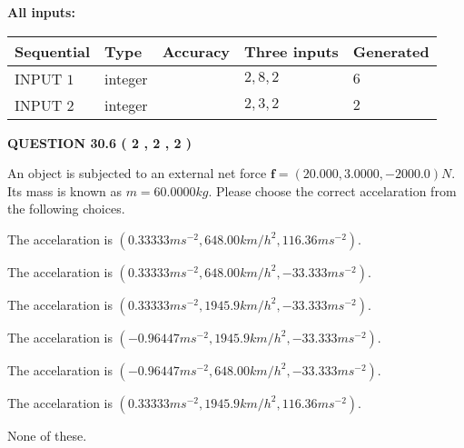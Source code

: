 \documentclass[12pt]{article}
\begin{document}
   
   
   
\noindent\vspace{0.1in}\hspace{-0.08in} {\textbf{\Large{All inputs: }}}
   
   
  
  
\noindent\begin{tabular}{|l|l|l|l|l|}
\hline
 Sequential & Type & Accuracy & Three inputs & Generated \\ 
\hline
 
 
  INPUT $            1 $ & integer &  & $
 2
 , 
 8
 , 
 2
 $ & $ 6 $ 
 \\  \hline  
 
 
  INPUT $            2 $ & integer &  & $
 2
 , 
 3
 , 
 2
 $ & $ 2 $ 
 \\  \hline  
 \end{tabular}
   
   
  
\vspace{0.2in}
  
{\textbf{\Large{QUESTION
30.6 
 (           2 ,           2 ,           2 )
}}}
  
  
 
An object is subjected to an external net force $\mathbf{f}=(
20.000 ,
3.0000,
-2000.0  )N$. Its mass is known as
$m= %
60.0000  kg$. Please choose the correct accelaration
from the following choices.
 
 
 
The accelaration is
$(
0.33333ms^{-2},
648.00km/h^2,
116.36ms^{-2}
).
$
 
 
The accelaration is
$(
0.33333ms^{-2},
648.00km/h^2,
-33.333ms^{-2}
).
$
 
 
The accelaration is
$(
0.33333ms^{-2},
1945.9km/h^2,
-33.333ms^{-2}
).
$
 
 
The accelaration is
$(
-0.96447ms^{-2},
1945.9km/h^2,
-33.333ms^{-2}
).
$
 
 
The accelaration is
$(
-0.96447ms^{-2},
648.00km/h^2,
-33.333ms^{-2}
).
$
 
 
The accelaration is
$(
0.33333ms^{-2},
1945.9km/h^2,
116.36ms^{-2}
).
$
 
 
 None of these.
 
 
\noindent{}
 
\end{document}
